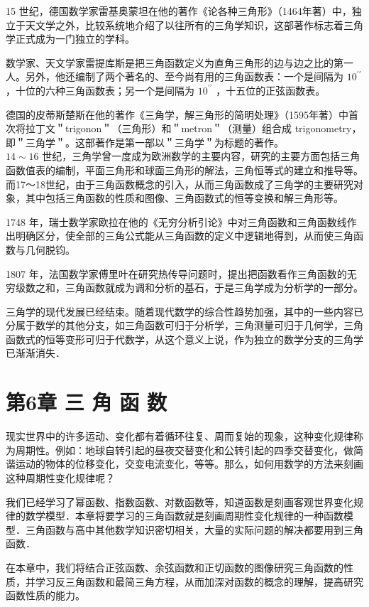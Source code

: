 \documentclass[10pt]{article}
\begin{document}
15 世纪，德国数学家雷基奥蒙坦在他的著作《论各种三角形》（1464年著）中，独立于天文学之外，比较系统地介绍了以往所有的三角学知识，这部著作标志着三角学正式成为一门独立的学科。

数学家、天文学家雷提库斯是把三角函数定义为直角三角形的边与边之比的第一人。另外，他还编制了两个著名的、至今尚有用的三角函数表：一个是间隔为 \(10^{\prime \prime}\) ，十位的六种三角函数表；另一个是间隔为 \(10^{\prime \prime}\) ，十五位的正弦函数表。

德国的皮蒂斯楚斯在他的著作《三角学，解三角形的简明处理》（1595年著）中首次将拉丁文＂trigonon＂（三角形）和＂metron＂（测量）组合成 trigonometry，即＂三角学＂。这部著作是第一部以＂三角学＂为标题的著作。\\
\(14 \sim 16\) 世纪，三角学曾一度成为欧洲数学的主要内容，研究的主要方面包括三角函数值表的编制，平面三角形和球面三角形的解法，三角恒等式的建立和推导等。而17～18世纪，由于三角函数概念的引入，从而三角函数成了三角学的主要研究对象，其中包括三角函数的性质和图像、三角函数式的恒等变换和解三角形等。

1748 年，瑞士数学家欧拉在他的《无穷分析引论》中对三角函数和三角函数线作出明确区分，使全部的三角公式能从三角函数的定义中逻辑地得到，从而使三角函数与几何脱钧。

1807 年，法国数学家傅里叶在研究热传导问题时，提出把函数看作三角函数的无穷级数之和，三角函数就成为调和分析的基石，于是三角学成为分析学的一部分。

三角学的现代发展已经结束。随着现代数学的综合性趋势加强，其中的一些内容已分属于数学的其他分支，如三角函数可归于分析学，三角测量可归于几何学，三角函数式的恒等变形可归于代数学，从这个意义上说，作为独立的数学分支的三角学已渐渐消失．

\section*{第6章 三 角 函 数}
现实世界中的许多运动、变化都有着循环往复、周而复始的现象，这种变化规律称为周期性。例如：地球自转引起的昼夜交替变化和公转引起的四季交替变化，做简谐运动的物体的位移变化，交变电流变化，等等。那么，如何用数学的方法来刻画这种周期性变化规律呢？

我们已经学习了幂函数、指数函数、对数函数等，知道函数是刻画客观世界变化规律的数学模型．本章将要学习的三角函数就是刻画周期性变化规律的一种函数模型．三角函数与高中其他数学知识密切相关，大量的实际问题的解决都要用到三角函数．

在本章中，我们将结合正弦函数、余弦函数和正切函数的图像研究三角函数的性质，并学习反三角函数和最简三角方程，从而加深对函数的概念的理解，提高研究函数性质的能力。
\end{document}
